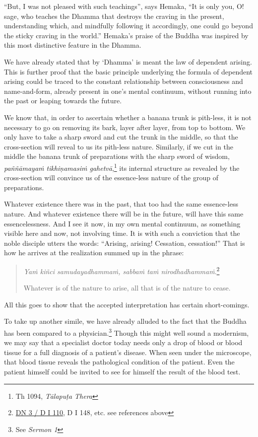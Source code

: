 ``But, I was not pleased with such teachings'', says Hemaka, ``It is only you, O! sage, who teaches the Dhamma that destroys the craving in the present, understanding which, and mindfully following it accordingly, one could go beyond the sticky craving in the world.'' Hemaka's praise of the Buddha was inspired by this most distinctive feature in the Dhamma.

We have already stated that by `Dhamma' is meant the law of dependent arising. This is further proof that the basic principle underlying the formula of dependent arising could be traced to the constant relationship between consciousness and name-and-form, already present in one's mental continuum, without running into the past or leaping towards the future.

We know that, in order to ascertain whether a banana trunk is pith-less, it is not necessary to go on removing its bark, layer after layer, from top to bottom. We only have to take a sharp sword and cut the trunk in the middle, so that the cross-section will reveal to us its pith-less nature. Similarly, if we cut in the middle the banana trunk of preparations with the sharp sword of wisdom, \emph{paññāmayaṁ tikhiṇamasiṁ gahetvā},\footnote{Th 1094, \emph{Tālapuṭa Thera}} its internal structure as revealed by the cross-section will convince us of the essence-less nature of the group of preparations.

Whatever existence there was in the past, that too had the same essence-less nature. And whatever existence there will be in the future, will have this same essencelessness. And I see it now, in my own mental continuum, as something visible here and now, not involving time. It is with such a conviction that the noble disciple utters the words: ``Arising, arising! Cessation, cessation!'' That is how he arrives at the realization summed up in the phrase:

\begin{quote}
\emph{Yaṁ kiñci samudayadhammaṁ, sabbaṁ taṁ nirodhadhammaṁ}.\footnote{\href{https://suttacentral.net/dn3/pli/ms}{DN 3 / D I 110}, D I 148, etc. see references above}

Whatever is of the nature to arise, all that is of the nature to cease.
\end{quote}

All this goes to show that the accepted interpretation has certain short-comings.

To take up another simile, we have already alluded to the fact that the Buddha has been compared to a physician.\footnote{See \emph{Sermon 1}} Though this might well sound a modernism, we may say that a specialist doctor today needs only a drop of blood or blood tissue for a full diagnosis of a patient's disease. When seen under the microscope, that blood tissue reveals the pathological condition of the patient. Even the patient himself could be invited to see for himself the result of the blood test.

